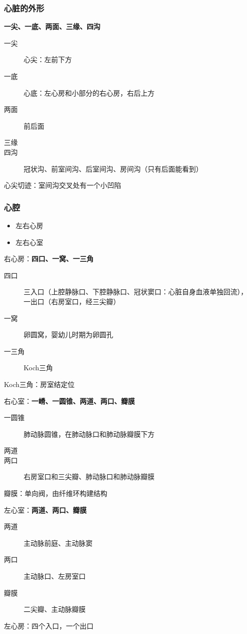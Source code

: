 \subsubsection*{心脏的外形}%
\label{subsub:心脏的外形}
\textbf{一尖、一底、两面、三缘、四沟}
\begin{description}
    \item[一尖] 心尖：左前下方
    \item [一底] 心底：左心房和小部分的右心房，右后上方
    \item [两面] 前后面
    \item [三缘] 
    \item [四沟] 冠状沟、前室间沟、后室间沟、房间沟（只有后面能看到）
\end{description}
\begin{notation}
心尖切迹：室间沟交叉处有一个小凹陷
\end{notation}
\subsubsection*{心腔}%
\label{subsub:心腔}
\begin{itemize}
    \item 左右心房
    \item 左右心室
\end{itemize}
右心房：\textbf{四口、一窝、一三角}
\begin{description}
    \item[四口] 三入口（上腔静脉口、下腔静脉口、冠状窦口：心脏自身血液单独回流），一出口（右房室口，经三尖瓣）
    \item [一窝] 卵圆窝，婴幼儿时期为卵圆孔
    \item [一三角] Koch三角
\end{description}
\begin{notation}
    Koch三角：房室结定位
\end{notation}
右心室：\textbf{一嵴、一圆锥、两道、两口、瓣膜}
\begin{description}
    \item[一圆锥] 肺动脉圆锥，在肺动脉口和肺动脉瓣膜下方
    \item [两道] 
    \item [两口] 右房室口和三尖瓣、肺动脉口和肺动脉瓣膜
\end{description}
\begin{notation}
瓣膜：单向阀，由纤维环构建结构
\end{notation}
左心室：\textbf{两道、两口、瓣膜}
\begin{description}
    \item[两道] 主动脉前庭、主动脉窦
    \item [两口] 主动脉口、左房室口
    \item [瓣膜] 二尖瓣、主动脉瓣膜
\end{description}
左心房：四个入口，一个出口
